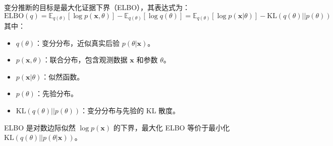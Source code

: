 \documentclass{article}
\begin{document}
变分推断的目标是最大化证据下界（ELBO），其表达式为：
\[
\text{ELBO}(q) = \mathbb{E}_{q(\theta)}[\log p(\mathbf{x}, \theta)] - \mathbb{E}_{q(\theta)}[\log q(\theta)] = \mathbb{E}_{q(\theta)}[\log p(\mathbf{x} | \theta)] - \text{KL}(q(\theta) || p(\theta))
\]
其中：
\begin{itemize}
    \item \( q(\theta) \)：变分分布，近似真实后验 \( p(\theta | \mathbf{x}) \)。
    \item \( p(\mathbf{x}, \theta) \)：联合分布，包含观测数据 \( \mathbf{x} \) 和参数 \( \theta \)。
    \item \( p(\mathbf{x} | \theta) \)：似然函数。
    \item \( p(\theta) \)：先验分布。
    \item \( \text{KL}(q(\theta) || p(\theta)) \)：变分分布与先验的 KL 散度。
\end{itemize}

ELBO 是对数边际似然 \( \log p(\mathbf{x}) \) 的下界，最大化 ELBO 等价于最小化 \( \text{KL}(q(\theta) || p(\theta | \mathbf{x})) \)。
\end{document}
